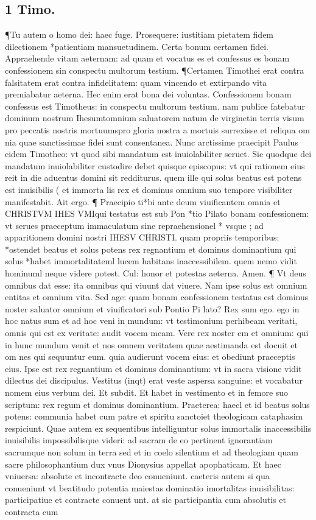 \documentclass{article}
\begin{document}
\begin{pages}
\section*{1 Timo. }
\marginpar{[ p.212 ]}\pstart ¶Tu autem o homo dei: haec fuge. Prosequere: iustitiam pietatem fidem dilectionem  *patientiam mansuetudinem. Certa bonum certamen fidei. Appraehende vitam aeternam: ad quam et vocatus es et confessus es bonam confessionem sin conspectu multorum testium. ¶Certamen Timothei erat contra falsitatem erat contra infidelitatem: quam vincendo et extirpando vita premiabatur aeterna. Hec enim erat bona dei voluntas. Confessionem bonam confessus est Timotheus: in conspectu multorum testium. nam publice fatebatur dominum nostrum Ihesumtomnium saluatorem natum de virginetin terris visum pro peccatis nostris mortuumspro gloria nostra a mortuis surrexisse et reliqua om nia quae sanctissimae fidei sunt consentanea. Nunc arctissime praecipit Paulus eidem Timotheo: vt quod sibi mandatum est inuiolabiliter seruet. Sic quodque dei mandatum inuiolabiliter custodire debet quisque episcopus: vt qui rationem eius reit in die aduentus domini sit redditurus. quem ille qui solus beatus est potens est inuisibilis ( et immorta lis rex et dominus omnium suo tempore visibiliter manifestabit. Ait ergo. ¶ Praecipio ti*bi ante deum viuificantem omnia et CHRISTVM IHES VMIqui testatus est sub Pon *tio Pilato bonam confessionem: vt serues praeceptum immaculatum sine repraehensionel * vsque ; ad apparitionem domini nostri IHESV CHRISTI. quam propriis temporibus: *ostendet beatus et solus potens rex regnantium et dominus dominantium qui solus *habet immortalitateml lucem habitans inaccessibilem. quem nemo vidit hominuml neque videre  potest. Cul: honor et potestas aeterna. Amen. ¶ Vt deus omnibus dat esse: ita omnibus qui viuunt dat viuere. Nam ipse solus est omnium entitas et omnium vita. Sed age: quam bonam confessionem testatus est dominus noster saluator omnium et viuificatori sub Pontio Pi lato? Rex sum ego. ego in hoc natus sum et ad hoc veni in mundum: vt testimonium perhibeam veritati, omnis qui est ex veritate: audit vocem meam. Vere rex noster em et omnium: qui in hunc mundum venit et nos omnem veritatem quae aestimanda est docuit et om nes qui sequuntur eum. quia audierunt vocem eius: et obediunt praeceptis eius. Ipse est rex regnantium et dominus dominantium: vt in sacra visione vidit dilectus dei discipulus. Vestitus (inqt) erat veste aspersa sanguine: et vocabatur nomem eius verbum dei. Et subdit. Et habet in vestimento et in femore suo scriptum: rex regum et dominus dominantium. Praeterea: haecl et id beatus solus potens: communia habet cum patre et spiritu sanctoiet theologicam cataphasim respiciunt. Quae autem ex sequentibus intelliguntur solus immortalis inaccessibilis inuisibilis impossibilisque videri: ad sacram de eo pertinent ignorantiam sacrumque non solum in terra sed et in coelo silentium et ad theologiam quam sacre philosophantium dux vnus Dionysius appellat apophaticam. Et haec vniuersa: absolute et incontracte deo conueniunt. caeteris autem si qua conueniunt vt beatitudo potentia maiestas dominatio imortalitas inuisibilitas: participatiue et contracte conuent unt. at sic participantia cum absolutis et contracta cum 
\end{pages}
\end{document}
